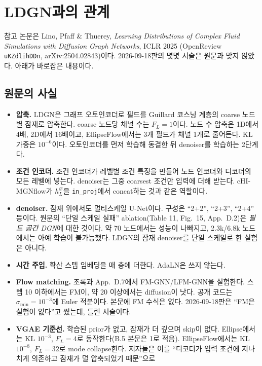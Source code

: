 \documentclass[11pt]{article}
\newcommand{\code}[1]{\texttt{#1}}
\begin{document}
\section{LDGN과의 관계}\label{sec:ldgn}

참고 논문은 Lino, Pfaff \& Thuerey, \textit{Learning Distributions of Complex
Fluid Simulations with Diffusion Graph Networks}, ICLR 2025
(OpenReview \code{uKZdlihDDn}, arXiv:2504.02843)이다. 2026-09-18판의 몇몇
서술은 원문과 맞지 않았다. 아래가 바로잡은 내용이다.

\subsection{원문의 사실}
\begin{itemize}
\item \textbf{압축.} LDGN은 그래프 오토인코더로 필드를 Guillard 코스닝 계층의
  coarse 노드별 잠재로 압축한다. coarse 노드당 채널 수는 $F_L=1$이다. 노드
  수 압축은 1D에서 4배, 2D에서 16배이고, EllipseFlow에서는 3개 필드가 채널
  1개로 줄어든다. KL 가중은 $10^{-6}$이다. 오토인코더를 먼저 학습해
  동결한 뒤 denoiser를 학습하는 2단계다.
\item \textbf{조건 인코더.} 조건 인코더가 레벨별 조건 특징을 만들어 노드
  인코더와 디코더의 모든 레벨에 넣는다. denoiser는 그중 coarsest 조건만 입력에
  더해 받는다. cHI-MGNflow가 $h_L^{\varnothing}$을 \code{in\_proj}에서
  concat하는 것과 같은 역할이다.
\item \textbf{denoiser.} 잠재 위에서도 멀티스케일 U-Net이다. 구성은
  ``2+2'', ``2+3'', ``2+4'' 등이다. 원문의 ``단일 스케일 실패''
  ablation(Table 11, Fig.~15, App.~D.2)은 \emph{필드 공간 DGN}에 대한 것이다.
  약 70 노드에서는 성능이 나빠지고, 2.3k/6.8k 노드에서는 아예 학습이
  불가능했다. LDGN의 잠재 denoiser를 단일 스케일로 한 실험은 아니다.
\item \textbf{시간 주입.} 확산 스텝 임베딩을 매 층에 더한다. AdaLN은 쓰지
  않는다.
\item \textbf{Flow matching.} 초록과 App.~D.7에서 FM-GNN/LFM-GNN을 실험한다.
  스텝 10 이하에서는 FM이, 약 20 이상에서는 diffusion이 낫다. 공개 코드는
  $\sigma_{\min}=10^{-3}$에 Euler 적분이다. 본문에 FM 수식은 없다. 2026-09-18판은
  ``FM은 실험이 없다''고 썼는데, 틀린 서술이다.
\item \textbf{VGAE 기준선.} 학습된 prior가 없고, 잠재가 더 깊으며 skip이 없다.
  Ellipse에서는 KL $10^{-3}$, $F_L=4$로 동작한다(B.5 본문은 1로 적음).
  EllipseFlow에서는 KL $10^{-8}$, $F_L=32$로 mode collapse한다. 저자들은 이를
  ``디코더가 입력 조건에 지나치게 의존하고 잠재가 덜 압축되었기 때문''으로

\end{itemize}
\end{document}
